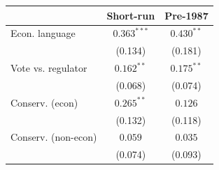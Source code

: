 \begin{tabular}{lcc}
\toprule
 & Short-run & Pre-1987 \\
\midrule
Econ. language & \(0.363^{***}\) & \(0.430^{**}\) \\
 & (0.134) & (0.181) \\
Vote vs. regulator & \(0.162^{**}\) & \(0.175^{**}\) \\
 & (0.068) & (0.074) \\
Conserv. (econ) & \(0.265^{**}\) & \(0.126\) \\
 & (0.132) & (0.118) \\
Conserv. (non-econ) & \(0.059\) & \(0.035\) \\
 & (0.074) & (0.093) \\
\bottomrule
\end{tabular}
